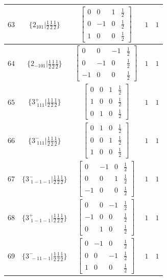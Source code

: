 \documentclass[fleqn,8pt]{jsarticle}
\begin{document}
\begin{longtable}{ccccc}
$ 63 $ & $ \{2{}_{101}|\frac{1}{2} \frac{1}{2} \frac{1}{2}\} $ & $ \begin{bmatrix} 0 & 0 & 1 & \frac{1}{2} \\ 0 & -1 & 0 & \frac{1}{2} \\ 1 & 0 & 0 & \frac{1}{2} \end{bmatrix} $ & $ 1 $ & $ 1 $ \\ \hline
$ 64 $ & $ \{2{}_{-101}|\frac{1}{2} \frac{1}{2} \frac{1}{2}\} $ & $ \begin{bmatrix} 0 & 0 & -1 & \frac{1}{2} \\ 0 & -1 & 0 & \frac{1}{2} \\ -1 & 0 & 0 & \frac{1}{2} \end{bmatrix} $ & $ 1 $ & $ 1 $ \\ \hline
$ 65 $ & $ \{3^{+}_{\,\,111}|\frac{1}{2} \frac{1}{2} \frac{1}{2}\} $ & $ \begin{bmatrix} 0 & 0 & 1 & \frac{1}{2} \\ 1 & 0 & 0 & \frac{1}{2} \\ 0 & 1 & 0 & \frac{1}{2} \end{bmatrix} $ & $ 1 $ & $ 1 $ \\ \hline
$ 66 $ & $ \{3^{-}_{\,\,111}|\frac{1}{2} \frac{1}{2} \frac{1}{2}\} $ & $ \begin{bmatrix} 0 & 1 & 0 & \frac{1}{2} \\ 0 & 0 & 1 & \frac{1}{2} \\ 1 & 0 & 0 & \frac{1}{2} \end{bmatrix} $ & $ 1 $ & $ 1 $ \\ \hline
$ 67 $ & $ \{3^{-}_{\,\,1-1-1}|\frac{1}{2} \frac{1}{2} \frac{1}{2}\} $ & $ \begin{bmatrix} 0 & -1 & 0 & \frac{1}{2} \\ 0 & 0 & 1 & \frac{1}{2} \\ -1 & 0 & 0 & \frac{1}{2} \end{bmatrix} $ & $ 1 $ & $ 1 $ \\ \hline
$ 68 $ & $ \{3^{+}_{\,\,1-1-1}|\frac{1}{2} \frac{1}{2} \frac{1}{2}\} $ & $ \begin{bmatrix} 0 & 0 & -1 & \frac{1}{2} \\ -1 & 0 & 0 & \frac{1}{2} \\ 0 & 1 & 0 & \frac{1}{2} \end{bmatrix} $ & $ 1 $ & $ 1 $ \\ \hline
$ 69 $ & $ \{3^{-}_{\,\,-11-1}|\frac{1}{2} \frac{1}{2} \frac{1}{2}\} $ & $ \begin{bmatrix} 0 & -1 & 0 & \frac{1}{2} \\ 0 & 0 & -1 & \frac{1}{2} \\ 1 & 0 & 0 & \frac{1}{2} \end{bmatrix} $ & $ 1 $ & $ 1 $ \\ \hline

\end{longtable}
\end{document}
